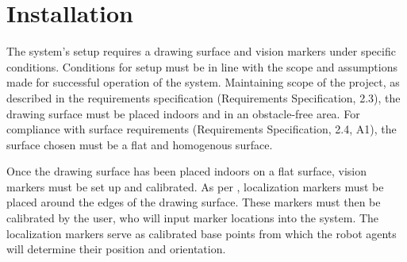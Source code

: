 
\section{Installation}
\label{sec:install}

The system's setup requires a drawing surface and vision markers under specific conditions. Conditions for setup must be in line with the scope and assumptions made for successful operation of the system. Maintaining scope of the project, as described in the requirements specification (Requirements Specification, 2.3), the drawing surface must be placed indoors and in an obstacle-free area. For compliance with surface requirements (Requirements Specification, 2.4, A1), the surface chosen must be a flat and homogenous surface.

Once the drawing surface has been placed indoors on a flat surface, vision markers must be set up and calibrated. As per , localization markers must be placed around the edges of the drawing surface. These markers must then be calibrated by the user, who will input marker locations into the system. The localization markers serve as calibrated base points from which the robot agents will determine their position and orientation.

